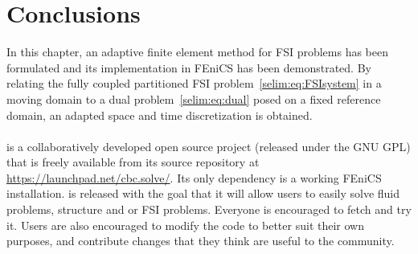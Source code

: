 \section{Conclusions}

In this chapter, an adaptive finite element method for FSI problems
has been formulated and its implementation in FEniCS has been
demonstrated. By relating the fully coupled partitioned FSI
problem~\eqref{selim:eq:FSIsystem} in a moving domain to a dual
problem~\eqref{selim:eq:dual} posed on a fixed reference domain, an
adapted space and time discretization is obtained.
\\\\
 is a collaboratively developed open source project
(released under the GNU GPL) that is freely available from its source
repository at \url{https://launchpad.net/cbc.solve/}. Its only
dependency is a working FEniCS installation.  is
released with the goal that it will allow users to easily solve fluid
problems, structure and or FSI problems. Everyone is encouraged to
fetch and try it.  Users are also encouraged to modify the code to
better suit their own purposes, and contribute changes that they think
are useful to the community.



